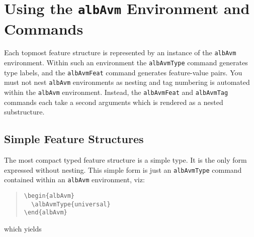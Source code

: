 \documentclass[a4paper,11pt]{article}
\begin{document}
\section{Using the \texttt{albAvm} Environment and Commands}
\label{sec:avm-examples:using-texttt-envir-comm}

Each topmost feature structure is represented by an instance of the
\texttt{albAvm} environment.  Within such an environment the
\texttt{albAvmType} command generates type labels, and the
\texttt{albAvmFeat} command generates feature-value pairs.  You must not
nest \texttt{albAvm} environments as nesting and tag numbering is
automated within the \texttt{albAvm} environment.  Instead, the
\texttt{albAvmFeat} and \texttt{albAvmTag} commands each take a second
arguments which is rendered as a nested substructure.


\subsection{Simple Feature Structures}
\label{sec:avm-examples:simple-feat-struct}

The most compact typed feature structure is a simple type.  It is the
only form expressed without nesting.  This simple form is just an
\texttt{albAvmType} command contained within an \texttt{albAvm}
environment, viz:
\begin{quote}
\begin{verbatim}
\begin{albAvm}
  \albAvmType{universal}
\end{albAvm}
\end{verbatim}
\end{quote}
which yields
\begin{quote}
  \begin{albAvm}
  \end{albAvm}
\end{quote}
\end{document}
